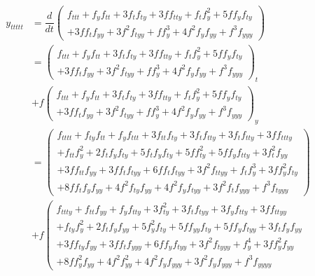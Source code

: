 \documentclass[a4paper,oneside]{book}
\numberwithin{equation}{chapter}
\begin{document}
\begin{align}
{y_{ttttt}} &= \dfrac{d}{{dt}}\left( \begin{array}{l}
{f_{ttt}} + {f_y}{f_{tt}} + 3{f_t}{f_{ty}} + 3f{f_{tty}} + {f_t}f_y^2 + 5f{f_y}{f_{ty}}\\
 + 3f{f_t}{f_{yy}} + 3{f^2}{f_{tyy}} + ff_y^3 + 4{f^2}{f_y}{f_{yy}} + {f^3}{f_{yyy}}
\end{array} \right)\\
& = {\left( \begin{array}{l}
{f_{ttt}} + {f_y}{f_{tt}} + 3{f_t}{f_{ty}} + 3f{f_{tty}} + {f_t}f_y^2 + 5f{f_y}{f_{ty}}\\
 + 3f{f_t}{f_{yy}} + 3{f^2}{f_{tyy}} + ff_y^3 + 4{f^2}{f_y}{f_{yy}} + {f^3}{f_{yyy}}
\end{array} \right)_t}\\
&+ f{\left( \begin{array}{l}
{f_{ttt}} + {f_y}{f_{tt}} + 3{f_t}{f_{ty}} + 3f{f_{tty}} + {f_t}f_y^2 + 5f{f_y}{f_{ty}}\\
 + 3f{f_t}{f_{yy}} + 3{f^2}{f_{tyy}} + ff_y^3 + 4{f^2}{f_y}{f_{yy}} + {f^3}{f_{yyy}}
\end{array} \right)_y}\\
 &= \left( \begin{array}{l}
{f_{tttt}} + {f_{ty}}{f_{tt}} + {f_y}{f_{ttt}} + 3{f_{tt}}{f_{ty}} + 3{f_t}{f_{tty}} + 3{f_t}{f_{tty}} + 3f{f_{ttty}}\\
 + {f_{tt}}f_y^2 + 2{f_t}{f_y}{f_{ty}} + 5{f_t}{f_y}{f_{ty}} + 5ff_{ty}^2 + 5f{f_y}{f_{tty}} + 3f_t^2{f_{yy}}\\
 + 3f{f_{tt}}{f_{yy}} + 3f{f_t}{f_{tyy}} + 6f{f_t}{f_{tyy}} + 3{f^2}{f_{ttyy}} + {f_t}f_y^3 + 3ff_y^2{f_{ty}}\\
 + 8f{f_t}{f_y}{f_{yy}} + 4{f^2}{f_{ty}}{f_{yy}} + 4{f^2}{f_y}{f_{tyy}} + 3{f^2}{f_t}{f_{yyy}} + {f^3}{f_{tyyy}}
\end{array} \right)\\
& + f\left( \begin{array}{l}
{f_{ttty}} + {f_{tt}}{f_{yy}} + {f_y}{f_{tty}} + 3f_{ty}^2 + 3{f_t}{f_{tyy}} + 3{f_y}{f_{tty}} + 3f{f_{ttyy}}\\
 + {f_{ty}}f_y^2 + 2{f_t}{f_y}{f_{yy}} + 5f_y^2{f_{ty}} + 5f{f_{yy}}{f_{ty}} + 5f{f_y}{f_{tyy}} + 3{f_t}{f_y}{f_{yy}}\\
 + 3f{f_{ty}}{f_{yy}} + 3f{f_t}{f_{yyy}} + 6f{f_y}{f_{tyy}} + 3{f^2}{f_{tyyy}} + f_y^4 + 3ff_y^2{f_{yy}}\\
 + 8ff_y^2{f_{yy}} + 4{f^2}f_{yy}^2 + 4{f^2}{f_y}{f_{yyy}} + 3{f^2}{f_y}{f_{yyy}} + {f^3}{f_{yyyy}}

\end{array}
\end{align}
\end{document}
